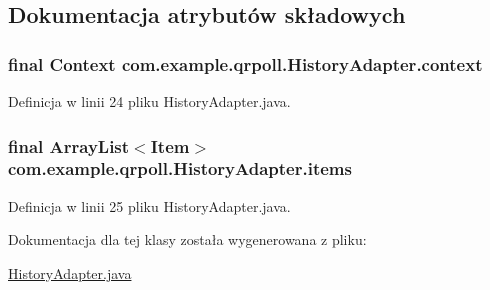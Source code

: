 \subsection{Dokumentacja atrybutów składowych}
\hypertarget{classcom_1_1example_1_1qrpoll_1_1_history_adapter_a118ff9b19fe9e292e2a60fc5b42150f9}{
\subsubsection[{context}]{\setlength{\rightskip}{0pt plus 5cm}final Context com.\+example.\+qrpoll.\+History\+Adapter.\+context\hspace{0.3cm}{\ttfamily [private]}}}\label{classcom_1_1example_1_1qrpoll_1_1_history_adapter_a118ff9b19fe9e292e2a60fc5b42150f9}


Definicja w linii 24 pliku History\+Adapter.\+java.

\hypertarget{classcom_1_1example_1_1qrpoll_1_1_history_adapter_adc0f747e0409d63449e90738b935ce1d}{
\subsubsection[{items}]{\setlength{\rightskip}{0pt plus 5cm}final Array\+List$<${\bf Item}$>$ com.\+example.\+qrpoll.\+History\+Adapter.\+items\hspace{0.3cm}{\ttfamily [private]}}}\label{classcom_1_1example_1_1qrpoll_1_1_history_adapter_adc0f747e0409d63449e90738b935ce1d}


Definicja w linii 25 pliku History\+Adapter.\+java.



Dokumentacja dla tej klasy została wygenerowana z pliku\+:\begin{DoxyCompactItemize}
\item 
\hyperlink{_history_adapter_8java}{History\+Adapter.\+java}\end{DoxyCompactItemize}
